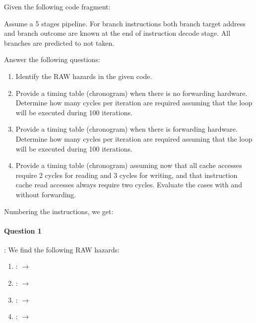 \begin{acexercise}\end{acexercise}
\label{ex:m4-01:instr-01}

Given the following code fragment:



Assume a 5 stages pipeline.
For branch instructions both branch target address and branch outcome are known
at the end of instruction decode stage. All branches are predicted to not taken.

Answer the following questions:
\begin{enumerate}
  \item Identify the RAW hazards in the given code.

  \item Provide a timing table (chronogram) when there is no forwarding hardware.
        Determine how many cycles per iteration are required assuming that the loop
        will be executed during 100 iterations.

  \item Provide a timing table (chronogram) when there is forwarding hardware.
        Determine how many cycles per iteration are required assuming that the loop
        will be executed during 100 iterations.

  \item Provide a timing table (chronogram) assuming now that all cache accesses
        require 2 cycles for reading and 3 cycles for writing, and that instruction
        cache read accesses always require two cycles. Evaluate the cases with and
        without forwarding.
\end{enumerate}


\begin{acsolution}\end{acsolution}

Numbering the instructions, we get:



\paragraph{Question 1}: 
We find the following RAW hazards:

\begin{enumerate}
  \item {}:  $\rightarrow$ 
  \item {}:  $\rightarrow$ 
  \item {}:  $\rightarrow$ 
  \item {}:  $\rightarrow$ 
\end{enumerate}

